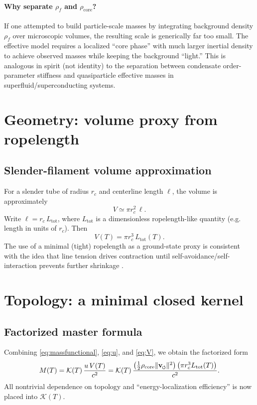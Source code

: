 \documentclass[11pt]{article}
\newcommand{\vnorm}{\lVert \mathbf{v}_{\mkern-2mu\scriptscriptstyle\boldsymbol{\circlearrowleft}} \rVert}  %
\newcommand{\rhoF}{\rho_{\!f}}\newcommand{\rhof}{\rho_{\!f}}     %
\newcommand{\rc}{r_c}                                    %
\newcommand{\rhocore}{\rho_{\mathrm{core}}}
\theoremstyle{definition}
\theoremstyle{plain}
\theoremstyle{remark}
\begin{document}
            \paragraph{Why separate $\rhoF$ and $\rhocore$?}
                If one attempted to build particle-scale masses by integrating background density $\rhoF$ over microscopic volumes, the resulting scale is generically far too small. The effective model requires a localized ``core phase'' with much larger inertial density to achieve observed masses while keeping the background ``light.'' This is analogous in spirit (not identity) to the separation between condensate order-parameter stiffness and quasiparticle effective masses in superfluid/superconducting systems.

        \section{Geometry: volume proxy from ropelength}

        \subsection{Slender-filament volume approximation}
            For a slender tube of radius $\rc$ and centerline length $\ell$, the volume is approximately
            \begin{equation}
                V \simeq \pi \rc^{2}\,\ell.
            \end{equation}
            Write $\ell = \rc\,L_{\mathrm{tot}}$, where $L_{\mathrm{tot}}$ is a dimensionless ropelength-like quantity (e.g. length in units of $\rc$). Then
            \begin{equation}
                V(T) = \pi \rc^{3}\,L_{\mathrm{tot}}(T).
                \label{eq:V}
            \end{equation}
            The use of a minimal (tight) ropelength as a ground-state proxy is consistent with the idea that line tension drives contraction until self-avoidance/self-interaction prevents further shrinkage \cite{Saffman1992}.

        \section{Topology: a minimal closed kernel}

        \subsection{Factorized master formula}
            Combining \eqref{eq:massfunctional}, \eqref{eq:u}, and \eqref{eq:V}, we obtain the factorized form
            \begin{equation}
                M(T)=\mathcal{K}(T)\,\frac{u\,V(T)}{c^{2}}
                =\mathcal{K}(T)\,\frac{\left(\frac12\rhocore \vnorm^{2}\right)\left(\pi \rc^{3} L_{\mathrm{tot}}(T)\right)}{c^{2}}.
                \label{eq:factorized}
            \end{equation}
            All nontrivial dependence on topology and ``energy-localization efficiency'' is now placed into $\mathcal{K}(T)$.
\end{document}
